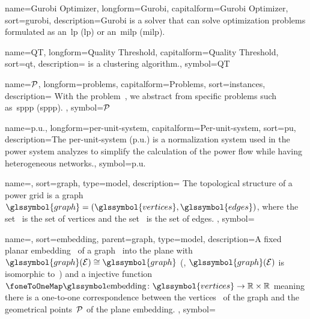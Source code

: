 {
   name={Gurobi Optimizer},
   longform={Gurobi},
   capitalform={Gurobi Optimizer},
   sort={gurobi},
   description={Gurobi is a solver that can solve optimization problems
   formulated as an~\acrlong{lp} (\gls{lp}) or an~\gls{milp} (\gls{milp}).}
}



{
    name={QT},
    longform={Quality Threshold},
    capitalform={Quality Threshold},
    sort={qt},
    description={ is a clustering algorithm.},
    symbol={QT}
}


{
    name={\ensuremath{\problems}},
    longform={problems},
    capitalform={Problems},
    sort={instances},
    description={ With the problem~, we abstract from
        specific problems such as~\acrlong{sppp} (\gls{sppp}). },
    symbol={\ensuremath{\problems}}
}



{
    name={p.u.},
    longform={per-unit-system},
    capitalform={Per-unit-system},
    sort={pu},
    description={The per-unit-system (p.u.) is a normalization system used in
    the power system analyzes to simplify the calculation of the power flow
    while having heterogeneous networks.},
    symbol={p.u.} 
}


{
    name={\graph},
    sort={graph},
    type={model},
    description={ The topological structure of a power grid is a
    graph~$\glssymbol{graph}
    =
    (\glssymbol{vertices},\glssymbol{edges})$, where the
    set~ is the set of vertices and the
    set~ is the set of edges. },
    symbol={\graph}
}

{
    name={\embedding},
    sort={embedding},
    parent={graph},
    type={model},
    description={A fixed planar embedding~ of a
    graph~ into the plane
    with~$\glssymbol{graph}(\embedding)\cong\glssymbol{graph}$ (\ie,
    $\glssymbol{graph}(\embedding)$ is isomorphic to~) and a
    injective function~$\embeddingMap\colon
    \glssymbol{vertices}\to\reals\times\reals$ meaning there is a one-to-one
    correspondence between the vertices~ of the graph and
    the geometrical points~$\mathcal{P}$ of the plane embedding. },
    symbol={\embedding}
}

